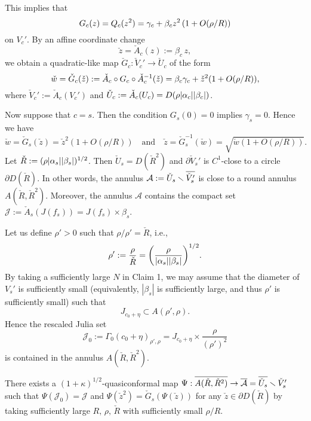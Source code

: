 This implies that
$$
G_c(z)=Q_c (z^2)=\gamma_c + \beta_c z^2\, {\left( 1+O(\rho/R) \right)}
$$ 
on $V_c'$.
By an affine coordinate change 
$$
\check{z}=\check{A}_c(z):=\beta_c\, z,
$$
we obtain a quadratic-like map $\check{G}_c:\check{V}_c' \to \check{U}_c$
of the form 
\begin{equation}
\check{w}=\check{G}_c(\check{z}):=\check{A}_c \circ G_c \circ \check{A}_c^{-1}(\check{z})
=\beta_c\gamma_c+\check{z}^2 
{\left( 1+O(\rho/R) \right)},
\label{eq_G_check}
\end{equation}
where $\check{V}_c':=\check{A}_c(V_c')$ and 
$\check{U}_c:=\check{A}_c(U_c)=D(\rho|\alpha_c||\beta_c|)$.


Now suppose that $c=s$.
Then the condition $G_s(0)=0$ implies $\gamma_s=0$.
Hence we have 
\begin{equation}\label{eq_G_check_s}
\check{w}=\check{G}_s(\check{z})=\check{z}^2(1+O(\rho/R))
\quad \text{and} \quad
\check{z}=\check{G}_s^{-1}(\check{w})=\sqrt{\check{w}(1+O(\rho/R))}.
\end{equation}
Let $\check{R}:=(\rho|\alpha_s||\beta_s|)^{1/2}$.
Then $\check{U}_s=D(\check{R}^2)$
and $\partial \check{V}_s'$ is
$C^1$-close to a circle $\partial D(\check{R})$.
In other words, the annulus 
$\mathcal{A}:=\check{U}_s \smallsetminus \overline{\check{V}_s'}$
is close to a round annulus $A(\check{R}, \check{R}^2)$.
Moreover, the annulus $\mathcal{A}$ contains the compact set
$\mathcal{J}:=\check{A}_s(J(f_s))=J(f_s) \times \beta_s$.

Let us define $\rho'>0$ such that $\rho/\rho'=\check{R}$, i.e.,
$$
\rho':=\frac{\rho}{\check{R}}={\left( \frac{\rho}{|\alpha_s||\beta_s|} \right)}^{1/2}.
$$
By taking a sufficiently large $N$ in Claim 1,
we may assume that the diameter of $V_s'$ is sufficiently small
(equivalently, $|\beta_s|$ is sufficiently large,
and thus $\rho'$ is sufficiently small) such that
$$
J_{c_0+\eta} \subset A(\rho',\rho). 
$$
Hence the rescaled Julia set  
$$
\mathcal{J}_0:=\Gamma_0(c_0+\eta)_{\rho',\rho}
= J_{c_0+\eta} \times \frac{\rho}{(\rho')^2}
$$
is contained in the annulus $A(\check{R}, \check{R}^2)$. 

\begin{lem}\label{lem_pre_tubing}
There exists a $(1+\kappa)^{1/2}$-quasiconformal map 
$\Psi:\overline{A(\check{R}, \check{R}^2)} 
\to \overline{\mathcal{A}}=\overline{\check{U}_s} \smallsetminus {\check{V}_s'}$
 such that $\Psi(\mathcal{J}_0)=\mathcal{J}$ and 
 $\Psi(\check{z}^2)=\check{G}_s(\Psi(\check{z}))$ 
 for any $\check{z} \in \partial D(\check{R})$
 by taking sufficiently large $R,\,\rho,\,\check{R}$ with sufficiently small $\rho/R$.
\end{lem}



